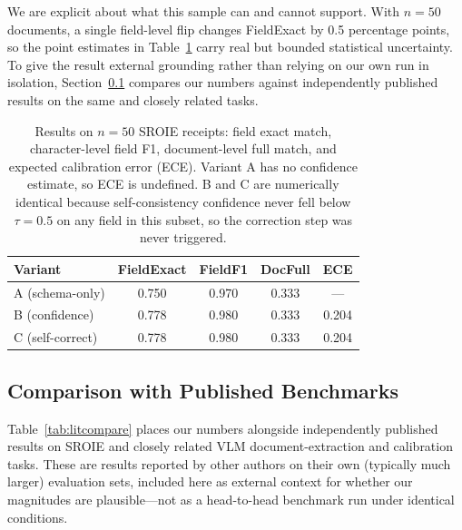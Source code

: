 \documentclass[conference]{IEEEtran}
\begin{document}
We are explicit about what this sample can and cannot support. With \(n=50\) documents, a single field-level flip changes FieldExact by 0.5 percentage points, so the point estimates in Table~\ref{tab:results} carry real but bounded statistical uncertainty. To give the result external grounding rather than relying on our own run in isolation, Section~\ref{sec:litcompare} compares our numbers against independently published results on the same and closely related tasks.

\begin{table}[htb]
\centering
\caption{Results on \(n=50\) SROIE receipts: field exact match, character-level field F1, document-level full match, and expected calibration error (ECE). Variant A has no confidence estimate, so ECE is undefined. B and C are numerically identical because self-consistency confidence never fell below \(\tau=0.5\) on any field in this subset, so the correction step was never triggered.}
\label{tab:results}
\begin{tabular}{lcccc}
\hline
\textbf{Variant} & \textbf{FieldExact} & \textbf{FieldF1} & \textbf{DocFull} & \textbf{ECE}\\
\hline
A (schema-only) & 0.750 & 0.970 & 0.333 & ---\\
B (confidence) & 0.778 & 0.980 & 0.333 & 0.204\\
C (self-correct) & 0.778 & 0.980 & 0.333 & 0.204\\
\hline
\end{tabular}
\end{table}

\subsection{Comparison with Published Benchmarks}
\label{sec:litcompare}
Table~\ref{tab:litcompare} places our numbers alongside independently published results on SROIE and closely related VLM document-extraction and calibration tasks. These are results reported by other authors on their own (typically much larger) evaluation sets, included here as external context for whether our magnitudes are plausible---not as a head-to-head benchmark run under identical conditions.
\end{document}
